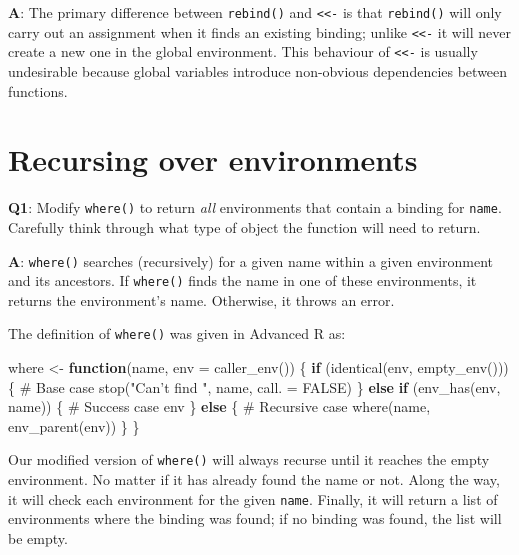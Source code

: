 \documentclass[
]{krantz}
\makeatletter
\newenvironment{Shaded}{\begin{snugshade}}{\end{snugshade}}
\newcommand{\CommentTok}[1]{\textcolor[rgb]{0.56,0.35,0.01}{\textit{#1}}}
\newcommand{\ControlFlowTok}[1]{\textcolor[rgb]{0.13,0.29,0.53}{\textbf{#1}}}
\newcommand{\DataTypeTok}[1]{\textcolor[rgb]{0.13,0.29,0.53}{#1}}
\newcommand{\KeywordTok}[1]{\textcolor[rgb]{0.13,0.29,0.53}{\textbf{#1}}}
\newcommand{\NormalTok}[1]{#1}
\newcommand{\OtherTok}[1]{\textcolor[rgb]{0.56,0.35,0.01}{#1}}
\newcommand{\StringTok}[1]{\textcolor[rgb]{0.31,0.60,0.02}{#1}}
\newenvironment{kframe}{%
\medskip{}
\setlength{\fboxsep}{.8em}
 \def\at@end@of@kframe{}%
 \ifinner\ifhmode%
  \def\at@end@of@kframe{\end{minipage}}%
  \begin{minipage}{\columnwidth}%
 \fi\fi%
 \def\FrameCommand##1{\hskip\@totalleftmargin \hskip-\fboxsep
 \colorbox{shadecolor}{##1}\hskip-\fboxsep
     \hskip-\linewidth \hskip-\@totalleftmargin \hskip\columnwidth}%
 \MakeFramed {\advance\hsize-\width
   \@totalleftmargin\z@ \linewidth\hsize
   \@setminipage}}%
 {\par\unskip\endMakeFramed%
 \at@end@of@kframe}
\renewenvironment{Shaded}{\begin{kframe}}{\end{kframe}}
\renewcommand{\KeywordTok} [1]{\textcolor[rgb]{0.00,0.44,0.13}{{#1}}}
\renewcommand{\DataTypeTok}[1]{\textcolor[rgb]{0.56,0.13,0.00}{{#1}}}
\renewcommand{\StringTok}  [1]{\textcolor[rgb]{0.25,0.44,0.63}{{#1}}}
\renewcommand{\CommentTok} [1]{\textcolor[rgb]{0.38,0.63,0.69}{{#1}}}
\renewcommand{\OtherTok}   [1]{\textcolor[rgb]{0.00,0.44,0.13}{{#1}}}
\renewcommand{\NormalTok}  [1]{{#1}}
\makeatother
\begin{document}
\textbf{{A}}: The primary difference between \texttt{rebind()} and \texttt{\textless{}\textless{}-} is that \texttt{rebind()} will only carry out an assignment when it finds an existing binding; unlike \texttt{\textless{}\textless{}-} it will never create a new one in the global environment. This behaviour of \texttt{\textless{}\textless{}-} is usually undesirable because global variables introduce non-obvious dependencies between functions.

\hypertarget{recursing-over-environments}{%
\section{Recursing over environments}\label{recursing-over-environments}}

\textbf{{Q1}}: Modify \texttt{where()} to return \emph{all} environments that contain a binding for \texttt{name}. Carefully think through what type of object the function will need to return.

\textbf{{A}}: \texttt{where()} searches (recursively) for a given name within a given environment and its ancestors. If \texttt{where()} finds the name in one of these environments, it returns the environment's name. Otherwise, it throws an error.

The definition of \texttt{where()} was given in Advanced R as:

\begin{Shaded}
\begin{Highlighting}[]
\NormalTok{where <-}\StringTok{ }\ControlFlowTok{function}\NormalTok{(name, }\DataTypeTok{env =} \KeywordTok{caller_env}\NormalTok{()) \{}
  \ControlFlowTok{if}\NormalTok{ (}\KeywordTok{identical}\NormalTok{(env, }\KeywordTok{empty_env}\NormalTok{())) \{}
    \CommentTok{# Base case}
    \KeywordTok{stop}\NormalTok{(}\StringTok{"Can't find "}\NormalTok{, name, }\DataTypeTok{call. =} \OtherTok{FALSE}\NormalTok{)}
\NormalTok{  \} }\ControlFlowTok{else} \ControlFlowTok{if}\NormalTok{ (}\KeywordTok{env_has}\NormalTok{(env, name)) \{}
    \CommentTok{# Success case}
\NormalTok{    env}
\NormalTok{  \} }\ControlFlowTok{else}\NormalTok{ \{}
    \CommentTok{# Recursive case}
    \KeywordTok{where}\NormalTok{(name, }\KeywordTok{env_parent}\NormalTok{(env))}
\NormalTok{  \}}
\NormalTok{\}}
\end{Highlighting}
\end{Shaded}

Our modified version of \texttt{where()} will always recurse until it reaches the empty environment. No matter if it has already found the name or not. Along the way, it will check each environment for the given \texttt{name}. Finally, it will return a list of environments where the binding was found; if no binding was found, the list will be empty.
\end{document}
